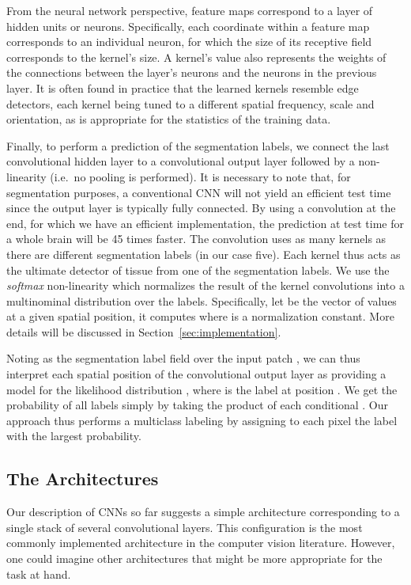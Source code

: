 \documentclass[final,5p,times,twocolumn]{elsarticle}
\begin{document}
From the neural network perspective, feature maps correspond to a layer of hidden units or neurons. Specifically, each coordinate within a feature map corresponds to an individual neuron, for which the size of its receptive field corresponds to the kernel's size. A kernel's value also represents the weights of the connections between the layer's neurons and the neurons in the previous layer. It is often found in practice that the learned kernels resemble edge detectors, each kernel being tuned to a different spatial frequency, scale and orientation, as is appropriate for the statistics of the training data. 




Finally, to perform a prediction of the segmentation labels, we connect the last convolutional hidden layer to a convolutional output layer followed by a non-linearity (i.e.\ no pooling is performed).  It is necessary to note that, for segmentation purposes, a conventional CNN will not yield an efficient test time since the output layer is typically fully connected. By using a convolution at the end, for which we have an efficient implementation, the prediction at test time for a whole brain will be 45 times faster.
The convolution uses as many kernels as there are different segmentation labels (in our case five). Each kernel thus acts as the ultimate detector of tissue from one of the segmentation labels. We use the {\it softmax} non-linearity which normalizes the result of the kernel convolutions into a multinominal distribution over the labels. Specifically, let  be the vector of values at a given spatial position, it computes  where  is a normalization constant.  More details will be discussed in Section~\ref{sec:implementation}.



Noting  as the segmentation label field over the input patch , we can thus interpret each spatial position of the convolutional output layer as providing a model for the likelihood distribution , where  is the label at position . We get the probability of all labels simply by taking the product of each conditional . Our approach thus performs a multiclass labeling by assigning to each pixel the label with the largest probability. 


\subsection{The Architectures}



Our description of CNNs so far suggests a simple architecture corresponding to a single stack of several convolutional layers. This configuration is the most commonly implemented architecture in the computer vision literature. However, one could imagine other architectures that might be more appropriate for the task at hand.
\end{document}
